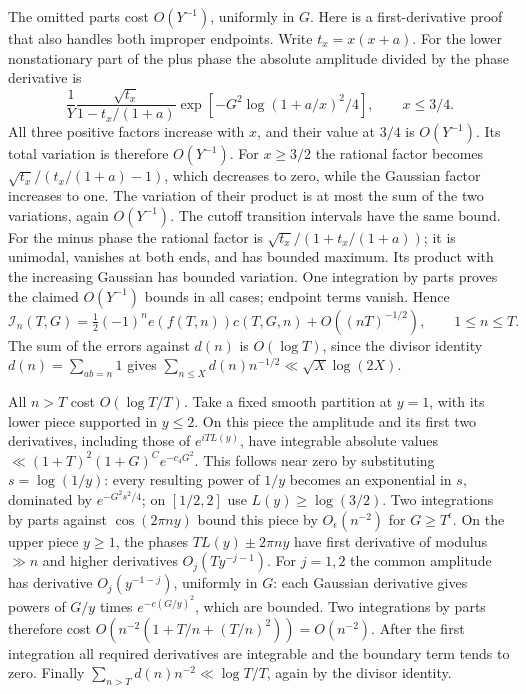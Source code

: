 The omitted parts cost $O(Y^{-1})$, uniformly in $G$. Here is a
first-derivative proof that also handles both improper endpoints.
Write $t_x=x(x+a)$. For the lower nonstationary part of the plus
phase the absolute amplitude divided by the phase derivative is
\[
 \frac1Y\frac{\sqrt{t_x}}{1-t_x/(1+a)}
           \exp[-G^2\log(1+a/x)^2/4],\qquad x\le3/4.
\]
All three positive factors increase with $x$, and their value at
$3/4$ is $O(Y^{-1})$. Its total variation is therefore $O(Y^{-1})$.
For $x\ge3/2$ the rational factor becomes
$\sqrt{t_x}/(t_x/(1+a)-1)$, which decreases to zero, while the
Gaussian factor increases to one. The variation of their product
is at most the sum of the two variations, again $O(Y^{-1})$.
The cutoff transition intervals have the same bound. For the minus
phase the rational factor is $\sqrt{t_x}/(1+t_x/(1+a))$; it is
unimodal, vanishes at both ends, and has bounded maximum.
Its product with the increasing Gaussian has bounded variation.
One integration by parts proves the claimed $O(Y^{-1})$ bounds in
all cases; endpoint terms vanish. Hence
\begin{equation}\label{eq:kernelAtkinson}
 \mathcal I_n(T,G)=\tfrac12(-1)^ne(f(T,n))c(T,G,n)
                           +O((nT)^{-1/2}),\qquad 1\le n\le T.
\end{equation}
The sum of the errors against $d(n)$ is $O(\log T)$, since the
divisor identity $d(n)=\sum_{ab=n}1$ gives
$\sum_{n\le X}d(n)n^{-1/2}\ll\sqrt X\log(2X)$.

All $n>T$ cost $O(\log T/T)$.
Take a fixed smooth partition at $y=1$, with its lower piece supported
in $y\le2$. On this piece the amplitude and its first two derivatives,
including those of $e^{iTL(y)}$, have integrable absolute values
$\ll (1+T)^2(1+G)^C e^{-c_4G^2}$.
This follows near zero by substituting $s=\log(1/y)$: every resulting
power of $1/y$ becomes an exponential in $s$, dominated by
$e^{-G^2s^2/4}$; on $[1/2,2]$ use $L(y)\ge\log(3/2)$.
Two integrations by parts against $\cos(2\pi ny)$ bound this piece
by $O_\epsilon(n^{-2})$ for $G\ge T^\epsilon$.
On the upper piece $y\ge1$, the phases
$TL(y)\pm2\pi ny$ have first derivative of modulus $\gg n$
and higher derivatives $O_j(Ty^{-j-1})$.
For $j=1,2$ the common amplitude has derivative
$O_j(y^{-1-j})$, uniformly in $G$: each Gaussian derivative gives
powers of $G/y$ times $e^{-c(G/y)^2}$, which are bounded.
Two integrations by parts therefore cost
$O(n^{-2}(1+T/n+(T/n)^2))=O(n^{-2})$.
After the first integration all required derivatives are integrable and the
boundary term tends to zero. Finally
$\sum_{n>T}d(n)n^{-2}\ll\log T/T$, again by the divisor identity.

